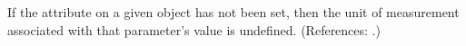 If the attribute  on a given \LocalParameter object has not been
set, then the unit of measurement associated with that parameter's value is
undefined.  (References: .)
